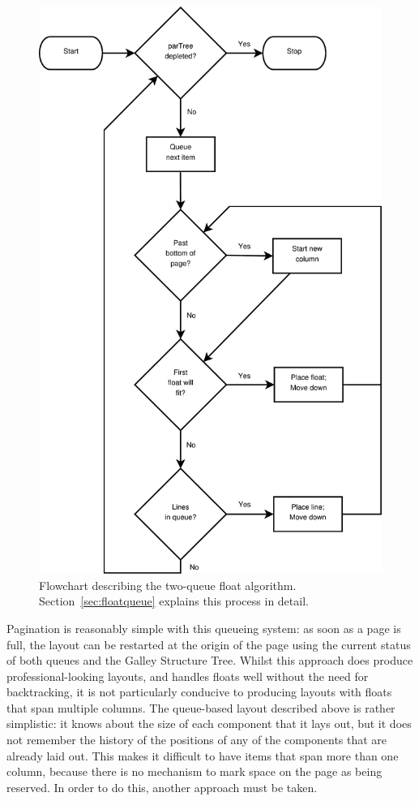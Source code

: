 \begin{figure}
  \begin{center}
  \includegraphics[width=\textwidth]{gfx/flowchart}
  \end{center}
  \caption[Flowchart of the two-queue float algorithm]{Flowchart describing the two-queue float algorithm. Section~\ref{sec:floatqueue} explains this process in detail.}
  \label{fig:float-flowchart}
\end{figure}

Pagination is reasonably simple with this queueing system: as soon as a page is full, the layout can be restarted at the origin of the page using the current status of both queues and the Galley Structure Tree. Whilst this approach does produce professional-looking layouts, and handles floats well without the need for backtracking, it is not particularly conducive to producing layouts with floats that span multiple columns. The queue-based layout described above is rather simplistic: it knows about the size of each component that it lays out, but it does not remember the history of the positions of any of the components that are already laid out. This makes it difficult to have items that span more than one column, because there is no mechanism to mark space on the page as being reserved. In order to do this, another approach must be taken.


